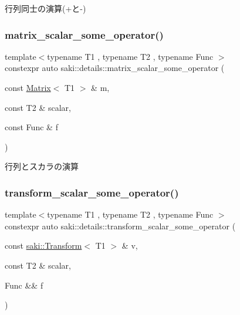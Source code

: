 行列同士の演算(+と-\/) 

\mbox{\label{namespacesaki_1_1details_a5d1039c410e252de4fd16095e5e6beea}} 
\subsubsection{\texorpdfstring{matrix\+\_\+scalar\+\_\+some\+\_\+operator()}{matrix\_scalar\_some\_operator()}}
{\footnotesize\ttfamily template$<$typename T1 , typename T2 , typename Func $>$ \\
constexpr auto saki\+::details\+::matrix\+\_\+scalar\+\_\+some\+\_\+operator (\begin{DoxyParamCaption}\item[{const \mbox{\hyperlink{classsaki_1_1_matrix}{Matrix}}$<$ T1 $>$ \&}]{m,  }\item[{const T2 \&}]{scalar,  }\item[{const Func \&}]{f }\end{DoxyParamCaption})}



行列とスカラの演算 

\mbox{\label{namespacesaki_1_1details_a2f5694f4bcf7f45e946384285562521e}} 
\subsubsection{\texorpdfstring{transform\+\_\+scalar\+\_\+some\+\_\+operator()}{transform\_scalar\_some\_operator()}}
{\footnotesize\ttfamily template$<$typename T1 , typename T2 , typename Func $>$ \\
constexpr auto saki\+::details\+::transform\+\_\+scalar\+\_\+some\+\_\+operator (\begin{DoxyParamCaption}\item[{const \mbox{\hyperlink{classsaki_1_1_transform}{saki\+::\+Transform}}$<$ T1 $>$ \&}]{v,  }\item[{const T2 \&}]{scalar,  }\item[{Func \&\&}]{f }\end{DoxyParamCaption})}



